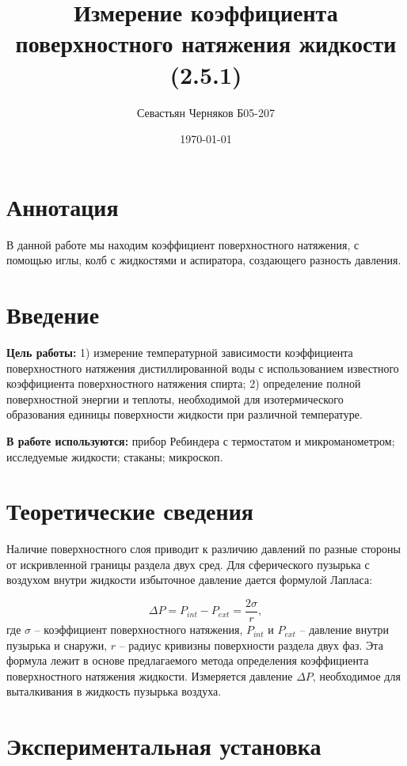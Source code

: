 \documentclass[a4paper,12pt]{article}
\title{Измерение коэффициента поверхностного натяжения жидкости (2.5.1)}
\author{Севастьян Черняков Б05-207}
\date{\today}
\theoremstyle{definition}
\begin{document}
	\maketitle
	\section{Аннотация}
	В данной работе мы находим коэффициент поверхностного натяжения, с помощью иглы, колб с жидкостями и аспиратора, создающего разность давления.
	\section{Введение}
	\noindent\textbf{Цель работы:}
	1) измерение температурной зависимости  коэффициента поверхностного натяжения дистиллированной воды с использованием известного коэффициента поверхностного натяжения спирта; 2) определение полной поверхностной энергии  и теплоты, необходимой для изотермического образования единицы  поверхности жидкости  при различной температуре.
	
	\bigskip
	\noindent\textbf{В работе используются:} прибор  Ребиндера  с термостатом и микроманометром; исследуемые жидкости; стаканы; микроскоп.
	\section{Теоретические сведения}
	
	Наличие поверхностного слоя приводит к различию давлений по разные стороны от искривленной границы раздела двух сред.  Для сферического пузырька с воздухом  внутри жидкости избыточное давление дается формулой Лапласа:
	
	\begin{equation}
		\Delta P = P_{int} - P_{ext} = \frac{2\sigma}{r},
		\label{key}
	\end{equation}
	где $ \sigma $ -- коэффициент поверхностного натяжения, $ P_{int} $ и $ P_{ext} $ -- давление внутри пузырька и снаружи, $ r $ -- радиус кривизны поверхности раздела двух фаз. Эта формула лежит в основе предлагаемого метода определения коэффициента поверхностного натяжения жидкости. Измеряется давление $ \Delta P $, необходимое для выталкивания в жидкость пузырька воздуха.
	
	\section{Экспериментальная установка}
	
\end{document}
